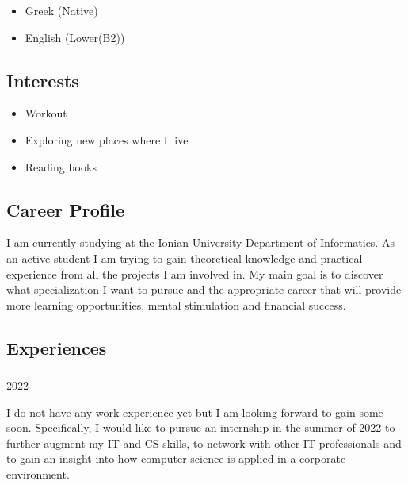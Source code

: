 \documentclass[english,]{article}
\providecommand{\tightlist}{%
  \setlength{\itemsep}{0pt}\setlength{\parskip}{0pt}}
\begin{document}
\begin{itemize}
\tightlist
\item
  Greek {(Native)}
\item
  English {(Lower(B2))}
\end{itemize}

\hypertarget{interests}{%
\subsection{Interests}\label{interests}}

\begin{itemize}
\tightlist
\item
  Workout
\item
  Exploring new places where I live
\item
  Reading books
\end{itemize}

\hypertarget{career-profile}{%
\subsection{\texorpdfstring{{ \emph{} \emph{} } Career
Profile}{    Career Profile}}\label{career-profile}}

I am currently studying at the Ionian University Department of
Informatics. As an active student I am trying to gain theoretical
knowledge and practical experience from all the projects I am involved
in. My main goal is to discover what specialization I want to pursue and
the appropriate career that will provide more learning opportunities,
mental stimulation and financial success.

\hypertarget{experiences}{%
\subsection{\texorpdfstring{{ \emph{} \emph{} }
Experiences}{    Experiences}}\label{experiences}}

\hypertarget{section}{%
\subsubsection{}\label{section}}

2022

I do not have any work experience yet but I am looking forward to gain
some soon. Specifically, I would like to pursue an internship in the
summer of 2022 to further augment my IT and CS skills, to network with
other IT professionals and to gain an insight into how computer science
is applied in a corporate environment.
\end{document}
